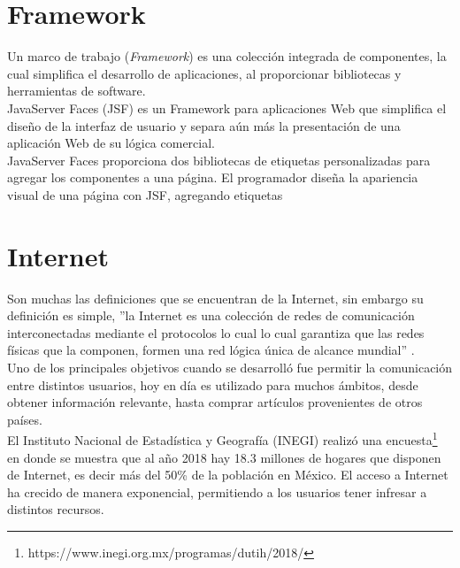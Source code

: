 \section{Framework}
Un marco de trabajo (\textit{Framework}) es una colección integrada de componentes, la cual simplifica el desarrollo de aplicaciones, al proporcionar bibliotecas y herramientas de software.\\


JavaServer Faces (JSF) es un Framework para aplicaciones Web que simplifica el diseño de la interfaz de usuario y separa aún más la presentación de una aplicación Web de su lógica comercial.
\\
JavaServer Faces proporciona dos bibliotecas de etiquetas personalizadas para agregar los componentes a una página. El programador diseña la apariencia visual de una página con JSF, agregando etiquetas

\section{Internet}

Son muchas las definiciones que se encuentran de la Internet, sin embargo su definición es simple, 
''la Internet es una colección de redes de comunicación interconectadas mediante el protocolos 
lo cual lo cual garantiza que las redes físicas que la componen, formen una red lógica única de 
alcance mundial'' \citep{CTInternet}.
\\

Uno de los principales objetivos cuando se desarrolló fue permitir la comunicación entre distintos usuarios,
hoy en día es utilizado para muchos ámbitos, desde obtener información relevante, hasta comprar artículos 
provenientes de otros países.
\\

El Instituto Nacional de Estadística y Geografía (INEGI) realizó una encuesta\footnote{https://www.inegi.org.mx/programas/dutih/2018/}  
en donde se muestra que al año 2018 hay 18.3 millones de hogares que disponen de Internet, es decir más del 
50\% de la población en México.
El acceso a Internet ha crecido de manera exponencial, permitiendo a los usuarios tener infresar a distintos recursos.



